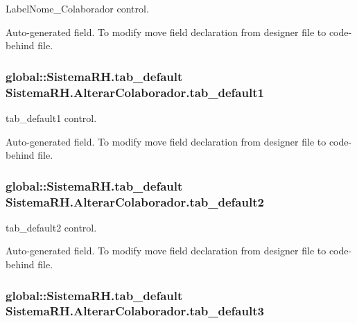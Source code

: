 LabelNome\_\-Colaborador control. 

Auto-\/generated field. To modify move field declaration from designer file to code-\/behind file. \hypertarget{class_sistema_r_h_1_1_alterar_colaborador_ae8f691957080d211fdd2207d2b51aaf9}{
\subsubsection[{tab\_\-default1}]{\setlength{\rightskip}{0pt plus 5cm}global::SistemaRH.tab\_\-default {\bf SistemaRH.AlterarColaborador.tab\_\-default1}}}
\label{class_sistema_r_h_1_1_alterar_colaborador_ae8f691957080d211fdd2207d2b51aaf9}


tab\_\-default1 control. 

Auto-\/generated field. To modify move field declaration from designer file to code-\/behind file. \hypertarget{class_sistema_r_h_1_1_alterar_colaborador_a8c9192f94dd44cfebf0ef89c9e9f2466}{
\subsubsection[{tab\_\-default2}]{\setlength{\rightskip}{0pt plus 5cm}global::SistemaRH.tab\_\-default {\bf SistemaRH.AlterarColaborador.tab\_\-default2}}}
\label{class_sistema_r_h_1_1_alterar_colaborador_a8c9192f94dd44cfebf0ef89c9e9f2466}


tab\_\-default2 control. 

Auto-\/generated field. To modify move field declaration from designer file to code-\/behind file. \hypertarget{class_sistema_r_h_1_1_alterar_colaborador_ae04046dd6eb4ff656b26551270979069}{
\subsubsection[{tab\_\-default3}]{\setlength{\rightskip}{0pt plus 5cm}global::SistemaRH.tab\_\-default {\bf SistemaRH.AlterarColaborador.tab\_\-default3}}}
\label{class_sistema_r_h_1_1_alterar_colaborador_ae04046dd6eb4ff656b26551270979069}


